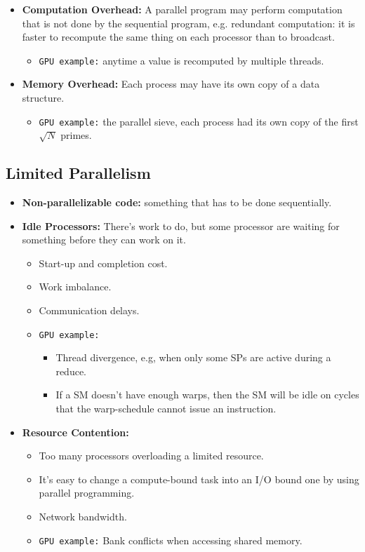 \documentclass[../main.tex]{subfiles}
\begin{document}
\begin{itemize}
\begin{itemize}
{		            }
	      \end{itemize}
	\item \textbf{Computation Overhead:} A parallel program may perform computation that is not done by the sequential program, e.g. redundant computation: it is faster to recompute the same thing on each processor than to broadcast.
	      \begin{itemize}
		      \item \texttt{GPU example:} anytime a value is recomputed by multiple threads.
	      \end{itemize}
	\item \textbf{Memory Overhead:} Each process may have its own copy of a data structure.
	       \begin{itemize}
		      \item \texttt{GPU example:} the parallel sieve, each process had its own copy of the first \(\sqrt{N}\) primes.
	      \end{itemize}
\end{itemize}

\subsection{Limited Parallelism}

\begin{itemize}
	\item \textbf{Non-parallelizable code:} something that has to be done sequentially.
	\item \textbf{Idle Processors:} There's work to do, but some processor are waiting for something before they can work on it.
	      \begin{itemize}
		      \item Start-up and completion cost.
		      \item Work imbalance.
		      \item Communication delays.
		      \item {
		            \texttt{GPU example:}
		            \begin{itemize}
			            \item Thread divergence, e.g, when only some SPs are active during a reduce.
			            \item If a SM doesn't have enough warps, then the SM will be idle on cycles that the warp-schedule cannot issue an instruction.
		            \end{itemize}
		            }
	      \end{itemize}
	\item \textbf{Resource Contention:}
	      \begin{itemize}
		      \item Too many processors overloading a limited resource.
		      \item It's easy to change a compute-bound task into an I/O bound one by using parallel programming.
		      \item Network bandwidth.
		      \item \texttt{GPU example:} Bank conflicts when accessing shared memory.
	      \end{itemize}
\end{itemize}
\end{document}
